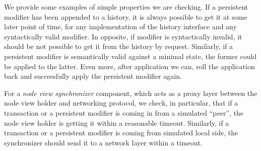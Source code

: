 We provide some examples of simple properties we are checking. If a persistent modifier has been appended to a history, it is always possible to get it at some later point of time, for any implementation of the history interface and any syntactically valid modifier. In opposite, if modifier is syntactically invalid, it should be not possible to get it from the history by request. Similarly, if a persistent modifier is semantically valid against a minimal state, the former could be applied to the latter. Even more, after application we can, roll the application back and successfully apply the persistent modifier again.  

For a {\em node view synchronizer} component, which acts as a proxy layer between the node view holder and networking protocol, we check, in particular, that if a transaction or a persistent modifier is coming in from a simulated ``peer'', the node view holder is getting it within a reasonable timeout. Similarly, if a transaction or a persistent modifier is coming from simulated local side, the synchronizer should send it to a network layer within a timeout.

